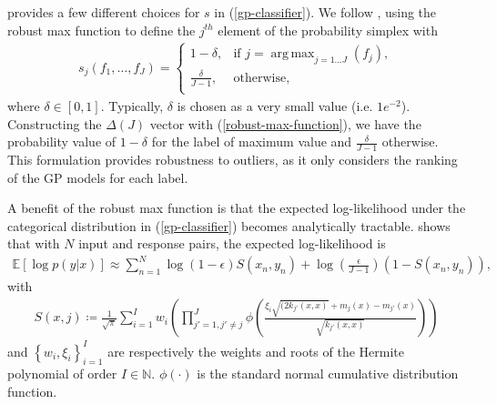 \documentclass{article}
\DeclareMathOperator*{\argmax}{arg\,max}
\numberwithin{equation}{section}
\begin{document}
\cite{matthews2017scalable} provides a few different choices for $s$ in (\ref{gp-classifier}). We follow \cite{wild2022generalized}, using the robust max function to define the $j^{th}$ element of the probability simplex with
\begin{align}
s_{j}\left(f_1, \dots, f_J\right) = \begin{cases}
      1-\delta, &  \text{if } j = \argmax_{j=1\dots J}\left(f_j\right), \\
      \frac{\delta}{J-1}, & \text{otherwise}, \\
   \end{cases}
   \label{robust-max-function}
\end{align}
where $\delta \in [0, 1]$. Typically, $\delta$ is chosen as a very small value (i.e. $1e^{-2}$). Constructing the $\Delta(J)$ vector with (\ref{robust-max-function}), we have the probability value of $1-\delta$ for the label of maximum value and $\frac{\delta}{J-1}$ otherwise. This formulation provides robustness to outliers, as it only considers the ranking of the GP models for each label.

A benefit of the robust max function is that the expected log-likelihood under the categorical distribution in (\ref{gp-classifier}) becomes analytically tractable. \cite{wild2022generalized} shows that with $N$ input and response pairs, the expected log-likelihood is
\begin{align}
    \mathbb{E} \left[\log p\left(y \vert x\right)\right] \approx \sum_{n=1}^N \log(1-\epsilon) S(x_n, y_n) + \log\left(\frac{\epsilon}{J-1}\right) \left(1-S(x_n, y_n)\right),
    \label{robust-max-function-expected-log-likelihood}
\end{align}
with  
\begin{align}
    S(x, j) \coloneqq \frac{1}{\sqrt{\pi}}\sum_{i=1}^{I} w_i \left(\prod_{j'=1, j'\neq j}^J \phi\left(\frac{\xi_i\sqrt{(2 k_{j'}(x, x)}+m_j(x) - m_{j'}(x)}{\sqrt{k_{j'}(x, x)}}\right)\right)
\end{align}
and $\left\{w_i, \xi_i\right\}_{i=1}^I$ are respectively the weights and roots of the Hermite polynomial of order $I \in \mathbb{N}$. $\phi(\cdot)$ is the standard normal cumulative distribution function. 

\newpage 
\end{document}
